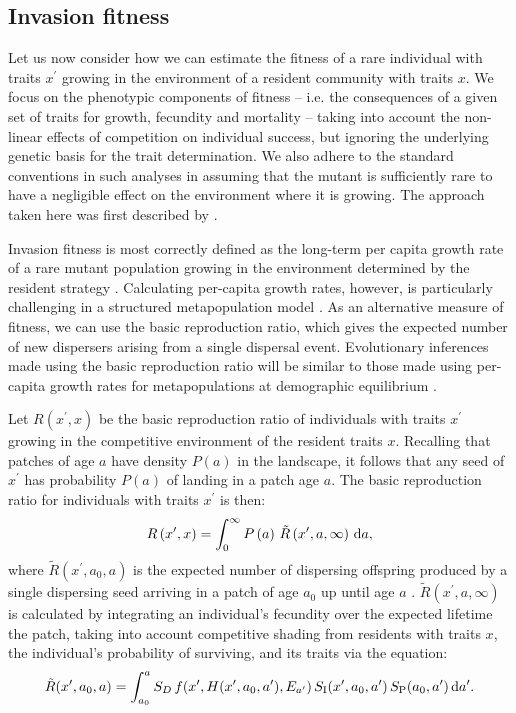 \documentclass[10pt,twoside]{article}
\begin{document}
\subsection{Invasion fitness}\label{invasion-fitness}

Let us now consider how we can estimate the fitness of a rare individual
with traits \(x^\prime\) growing in the environment of a resident
community with traits \(x\). We focus on the phenotypic components
of fitness -- i.e. the consequences of a given set of traits for growth,
fecundity and mortality -- taking into account the non-linear effects of
competition on individual success, but ignoring the underlying genetic
basis for the trait determination. We also adhere to the standard
conventions in such analyses in assuming that the mutant is sufficiently
rare to have a negligible effect on the environment where it is growing.
The approach taken here was first described by \citep{Falster-2015}.

Invasion fitness is most correctly defined as the long-term per capita
growth rate of a rare mutant population growing in the environment
determined by the resident strategy \citep{Metz-1992}. Calculating
per-capita growth rates, however, is particularly challenging in a
structured metapopulation model \citep{Gyllenberg-2001, Metz-2001}. As
an alternative measure of fitness, we can use the basic reproduction
ratio, which gives the expected number of new dispersers arising from a
single dispersal event. Evolutionary inferences made using the basic
reproduction ratio will be similar to those made using per-capita growth
rates for metapopulations at demographic equilibrium
\citep{Gyllenberg-2001, Metz-2001}.

Let \(R\left(x^\prime, x\right)\) be the basic reproduction ratio of
individuals with traits \(x^\prime\) growing in the competitive
environment of the resident traits \(x\). Recalling that patches of age
\(a\) have density \(P(a)\) in the landscape, it follows that any seed
of \(x^\prime\) has probability \(P(a)\) of landing in a patch age
\(a\). The basic reproduction ratio for individuals with traits
\(x^\prime\) is then:
\begin{equation} \label{eq:InvFit}
  R\left(x^\prime,x\right) = \int _0^{\infty} P\left(a\right) \, \tilde{R}\left(x^\prime, a, \infty \right) \, {\rm d}a ,
\end{equation}
where \(\tilde{R}\left(x^\prime, a_0, a \right)\) is the expected number
of dispersing offspring produced by a single dispersing seed arriving in
a patch of age \(a_0\) up until age \(a\)
\citep{Gyllenberg-2001, Metz-2001}.
\(\tilde{R}\left(x^\prime, a,\infty\right)\) is calculated by integrating
an individual's fecundity over the expected lifetime the patch, taking
into account competitive shading from residents with traits \(x\), the
individual's probability of surviving, and its traits via the equation:
\begin{equation} \label{eq:tildeR}
  \tilde{R}(x^\prime, a_0, a) = \int_{a_0}^{a}  S_D \, f(x^\prime, H(x^\prime, a_0, a^\prime), E_{a^\prime}) \, S_{\rm I} (x^\prime, a_0, a^\prime) \, S_{\rm P} (a_0, a^\prime) \, {\rm d} a^\prime.
\end{equation}
\end{document}
